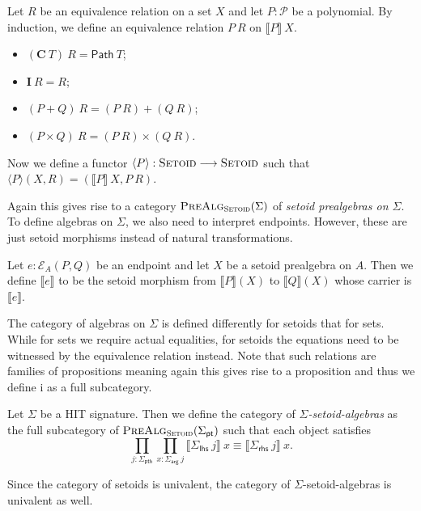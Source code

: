 \documentclass[9pt]{entcs}
\newcommand{\constructor}[1]{\mathbf{#1}}
\newcommand{\category}[1]{\textsc{#1}}
\newcommand{\function}[1]{\mathsf{#1}}
\newcommand{\deprod}[3]{\prod_{#1 : #2} #3} %
\newcommand{\0}{\textbf{0}} %
\newcommand{\1}{\textbf{1}} %
\newcommand{\setoids}{\category{Setoid}} %
\newcommand{\functor}[2]{#1 \longrightarrow #2} %
\newcommand{\poly}{\mathcal{P}} %
\newcommand{\C}{\constructor{C}} %
\newcommand{\I}{\constructor{I}} %
\newcommand{\sumP}[2]{#1 + #2} %
\newcommand{\prodP}[2]{#1 \times #2} %
\newcommand{\pathR}[1]{\function{Path} \> #1} %
\newcommand{\sumR}[2]{#1 + #2} %
\newcommand{\prodR}[2]{#1 \times #2} %
\newcommand{\polyR}[2]{#1 \> #2} %
\newcommand{\ep}[3]{\mathcal{E}_{#1}(#2,#3)} %
\newcommand{\pt}[0]{\textsf{pt}}
\newcommand{\pthI}[0]{\textsf{pth}}
\newcommand{\pthA}[0]{\textsf{arg}}
\newcommand{\pthlh}[0]{\textsf{lhs}}
\newcommand{\pthrh}[0]{\textsf{rhs}}
\newcommand{\pointc}[1]{#1_{\pt}} %
\newcommand{\pathI}[1]{#1_{\pthI}} %
\newcommand{\pathA}[1]{#1_{\pthA}} %
\newcommand{\pathlh}[1]{#1_{\pthlh}} %
\newcommand{\pathrh}[1]{#1_{\pthrh}} %
\newcommand{\semP}[1]{\llbracket #1 \rrbracket} %
\newcommand{\semE}[1]{\llbracket #1 \rrbracket} %
\newcommand{\semPT}[1]{\langle #1 \rangle} %
\newcommand{\prealgst}[1]{\category{PreAlg}_{\setoids}(#1)} %
\begin{document}
\begin{definition}
Let $R$ be an equivalence relation on a set $X$ and let $P : \poly$ be a polynomial.
By induction, we define an equivalence relation $\polyR{P}{R}$ on $\semP{P} \> X$.
\begin{itemize}
	\item $\polyR{(\C \> T)}{R} = \pathR{T}$;
	\item $\polyR{\I}{R} = R$;
	\item $\polyR{(\sumP{P}{Q})}{R} = \sumR{(\polyR{P}{R})}{(\polyR{Q}{R})}$;
	\item $\polyR{(\prodP{P}{Q})}{R} = \prodR{(\polyR{P}{R})}{(\polyR{Q}{R})}$.
\end{itemize}
Now we define a functor $\semPT{P} : \functor{\setoids}{\setoids}$ such that $\semPT{P}(X,R) = (\semP{P} \> X, P \> R)$.
\end{definition}

Again this gives rise to a category $\prealgst{\Sigma}$ of \emph{setoid prealgebras on $\Sigma$}.
To define algebras on $\Sigma$, we also need to interpret endpoints.
However, these are just setoid morphisms instead of natural transformations.

\begin{definition}
Let $e : \ep{A}{P}{Q}$ be an endpoint and let $X$ be a setoid prealgebra on $A$.
Then we define $\semE{e}$ to be the setoid morphism from $\semE{P}(X)$ to $\semE{Q}(X)$ whose carrier is $\semP{e}$.
\end{definition}

The category of algebras on $\Sigma$ is defined differently for setoids that for sets.
While for sets we require actual equalities, for setoids the equations need to be witnessed by the equivalence relation instead.
Note that such relations are families of propositions meaning again this gives rise to a proposition and thus we define i as a full subcategory.

\begin{definition}
Let $\Sigma$ be a HIT signature.
Then we define the category of \emph{$\Sigma$-setoid-algebras} as the full subcategory of $\prealgst{\pointc{\Sigma}}$ such that each object satisfies
\[
\deprod{j}{\pathI{\Sigma}}{\deprod{x}{\pathA{\Sigma} \> j}{\semE{\pathlh{\Sigma} \> j} \> x \equiv \semE{\pathrh{\Sigma} \> j} \> x}}.
\]
\end{definition}

Since the category of setoids is univalent, the category of $\Sigma$-setoid-algebras is univalent as well.
\end{document}
